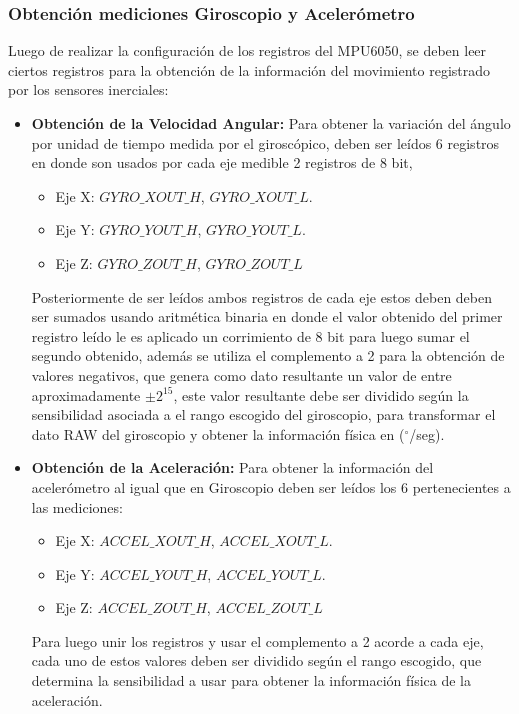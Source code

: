 \documentclass[12pt,a4paper]{article}
\newcommand{\grad}{$^{\circ}$}
\begin{document}
			\subsubsection{Obtención mediciones Giroscopio y Acelerómetro}
			Luego de realizar la configuración de los registros del MPU6050, se deben leer ciertos registros para la obtención de la información del movimiento registrado por los sensores inerciales:
			
			\begin{itemize}
				\item \textbf{Obtención de la Velocidad Angular:} Para obtener la variación del ángulo por unidad de tiempo medida por el giroscópico, deben ser leídos 6 registros en donde son usados por cada eje medible 2 registros de 8 bit,
				\begin{itemize}
					\item Eje X: $GYRO\_XOUT\_H$, $GYRO\_XOUT\_L$.
					\item Eje Y: $GYRO\_YOUT\_H$, $GYRO\_YOUT\_L$.
					\item Eje Z: $GYRO\_ZOUT\_H$, $GYRO\_ZOUT\_L$
				\end{itemize}
				Posteriormente de ser leídos ambos registros de cada eje estos deben deben ser sumados usando aritmética binaria en donde el valor obtenido del primer registro leído le es aplicado un corrimiento de 8 bit para luego sumar el segundo obtenido, además se utiliza el complemento a 2 para la obtención de valores negativos, que genera como dato resultante un valor de entre aproximadamente $\pm 2^{15}$, este valor resultante debe ser dividido según la sensibilidad asociada a el rango escogido del giroscopio, para transformar el dato RAW del giroscopio y obtener la información física en (\grad/seg).
				
				\item \textbf{Obtención de la Aceleración:} Para obtener la información del acelerómetro al igual que en Giroscopio deben ser leídos los 6 pertenecientes a las mediciones:
				\begin{itemize}
					\item Eje X: $ACCEL\_XOUT\_H$, $ACCEL\_XOUT\_L$.
					\item Eje Y: $ACCEL\_YOUT\_H$, $ACCEL\_YOUT\_L$.
					\item Eje Z: $ACCEL\_ZOUT\_H$, $ACCEL\_ZOUT\_L$
				\end{itemize}
				
				Para luego unir los registros y usar el complemento a 2 acorde a cada eje, cada uno de estos valores deben ser dividido según el rango escogido, que determina la sensibilidad a usar para obtener la información física de la aceleración.
				

\end{itemize}
\end{document}
